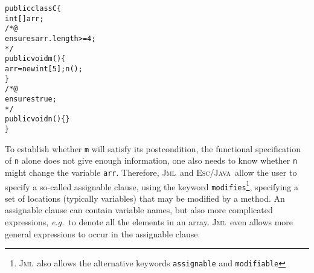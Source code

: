 \documentclass[a4paper]{llncs}
\newcommand{\jml}{\textsc{Jml}}
\newcommand{\escj}{\textsc{Esc/Java}}
\newcommand{\jass}{\textsc{Jass}}
\newcommand{\java}{\textsc{Java}}
\newcommand{\eiff}{\textsc{Eiffel}}
\newcommand{\csrc}{\textsc{Compaq Src}}
\begin{document}



\begin{alltt}
public class C\verb!{!
  int[] arr;
  /*@
    ensures arr.length >= 4;
   */
  public void m()\verb!{!
    arr = new int[5]; n();
  \verb!}!
  /*@
    ensures true;
   */
  public void n()\verb!{}!
\verb!}!
\end{alltt}
To establish whether \texttt{m} will satisfy its postcondition, the
functional specification of \texttt{n} alone does not give enough
information, one also needs to know whether \texttt{n} might change
the variable \texttt{arr}. Therefore, \jml\ and \escj\ allow the user
to specify a so-called assignable clause,  using the
keyword \texttt{modifies}\footnote{\jml\ also allows the alternative
keywords \texttt{assignable} and \texttt{modifiable}}, specifying a
set of locations (typically variables) that may be modified by a
method. An assignable clause can contain variable names,
but also more  complicated expressions, \emph{e.g.}~to denote all the
elements in an array. \jml\ even allows more general expressions to
occur in the assignable clause.
\end{document}
